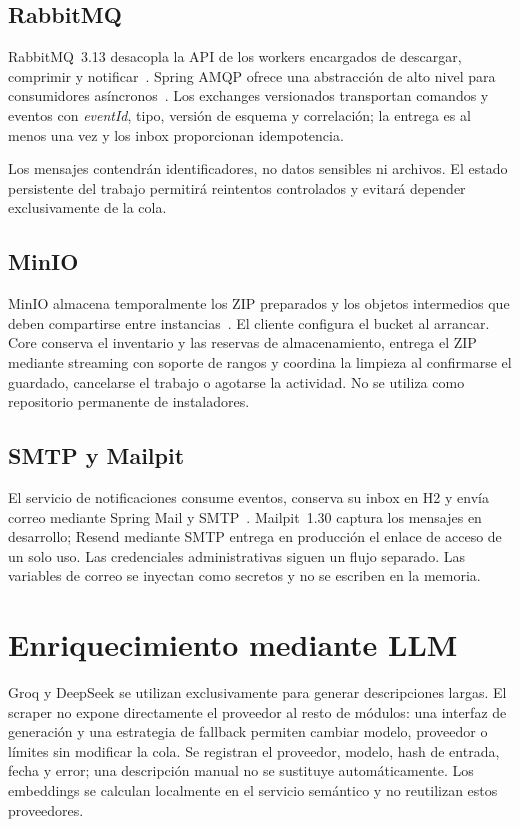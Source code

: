 \subsection{RabbitMQ}

RabbitMQ~3.13 desacopla la API de los workers encargados de descargar, comprimir y notificar~\cite{rabbitmq}. Spring AMQP ofrece una abstracción de alto nivel para consumidores asíncronos~\cite{springamqp}. Los exchanges versionados transportan comandos y eventos con \emph{eventId}, tipo, versión de esquema y correlación; la entrega es al menos una vez y los inbox proporcionan idempotencia.

Los mensajes contendrán identificadores, no datos sensibles ni archivos. El estado persistente del trabajo permitirá reintentos controlados y evitará depender exclusivamente de la cola.

\subsection{MinIO}

MinIO almacena temporalmente los ZIP preparados y los objetos intermedios que deben compartirse entre instancias~\cite{minio}. El cliente  configura el bucket al arrancar. Core conserva el inventario y las reservas de almacenamiento, entrega el ZIP mediante streaming con soporte de rangos y coordina la limpieza al confirmarse el guardado, cancelarse el trabajo o agotarse la actividad. No se utiliza como repositorio permanente de instaladores.

\subsection{SMTP y Mailpit}

El servicio de notificaciones consume eventos, conserva su inbox en H2 y envía correo mediante Spring Mail y SMTP~\cite{smtp}. Mailpit~1.30 captura los mensajes en desarrollo; Resend mediante SMTP entrega en producción el enlace de acceso de un solo uso. Las credenciales administrativas siguen un flujo separado. Las variables de correo se inyectan como secretos y no se escriben en la memoria.

\section{Enriquecimiento mediante LLM}

Groq y DeepSeek se utilizan exclusivamente para generar descripciones largas. El scraper no expone directamente el proveedor al resto de módulos: una interfaz de generación y una estrategia de fallback permiten cambiar modelo, proveedor o límites sin modificar la cola. Se registran el proveedor, modelo, hash de entrada, fecha y error; una descripción manual no se sustituye automáticamente. Los embeddings se calculan localmente en el servicio semántico y no reutilizan estos proveedores.

